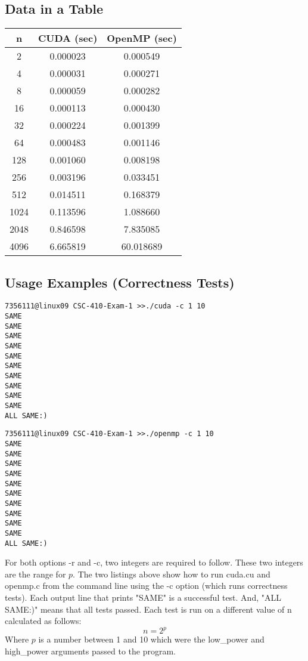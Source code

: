 \documentclass[12pt]{article}
\begin{document}
\subsection*{Data in a Table}
\begin{center}
  \begin{tabular}{ |c|c|c| } 
    \hline
    n & CUDA (sec) & OpenMP (sec) \\
    \hline
    2 &  0.000023 & 0.000549 \\
    4 & 0.000031 & 0.000271 \\
    8 & 0.000059 & 0.000282 \\
    16 & 0.000113 & 0.000430 \\
    32 & 0.000224 & 0.001399 \\
    64 & 0.000483 & 0.001146 \\
    128 & 0.001060 & 0.008198 \\
    256 & 0.003196 & 0.033451 \\
    512 & 0.014511 & 0.168379 \\
    1024 & 0.113596 & 1.088660 \\
    2048 & 0.846598 & 7.835085 \\
    4096 & 6.665819 & 60.018689 \\
    \hline
  \end{tabular}
\end{center}
\newpage
\subsection*{Usage Examples (Correctness Tests)}
\begin{verbatim}
7356111@linux09 CSC-410-Exam-1 >>./cuda -c 1 10
SAME
SAME
SAME
SAME
SAME
SAME
SAME
SAME
SAME
SAME
ALL SAME:)
\end{verbatim}
\begin{verbatim}
7356111@linux09 CSC-410-Exam-1 >>./openmp -c 1 10
SAME
SAME
SAME
SAME
SAME
SAME
SAME
SAME
SAME
SAME
ALL SAME:)
\end{verbatim}
For both options -r and -c, two integers are required to follow. These two integers are the range for $p$.
The two listings above show how to run cuda.cu and openmp.c from the command line using the -c option (which
runs correctness tests). Each output line that prints "SAME" is a successful test. 
And, "ALL SAME:)" means that all tests passed.  Each test is run on a different value of n calculated as follows:
\[
  n = 2^p 
\]
Where $p$ is a number between 1 and 10 which were the low\_power and high\_power arguments passed to the program.
\end{document}
